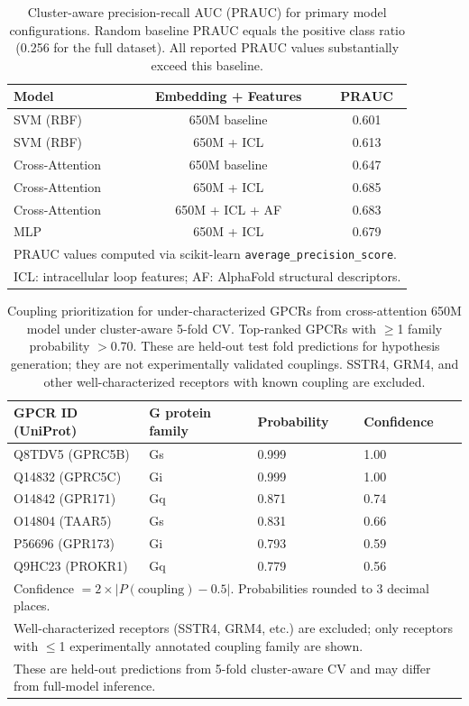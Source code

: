 \documentclass[11pt,a4paper]{article}
\begin{document}
\begin{table}[h!]
\centering
\caption{Cluster-aware precision-recall AUC (PRAUC) for primary model configurations. Random baseline PRAUC equals the positive class ratio (0.256 for the full dataset). All reported PRAUC values substantially exceed this baseline.}
\label{tab:prauc}
\begin{tabular}{lcc}
\toprule
Model & Embedding + Features & PRAUC \\
\midrule
SVM (RBF)       & 650M baseline      & 0.601 \\
SVM (RBF)       & 650M + ICL         & 0.613 \\
Cross-Attention & 650M baseline      & 0.647 \\
Cross-Attention & 650M + ICL         & 0.685 \\
Cross-Attention & 650M + ICL + AF    & 0.683 \\
MLP             & 650M + ICL         & 0.679 \\
\bottomrule
\multicolumn{3}{l}{\small PRAUC values computed via scikit-learn \texttt{average\_precision\_score}.} \\
\multicolumn{3}{l}{\small ICL: intracellular loop features; AF: AlphaFold structural descriptors.} \\
\end{tabular}
\end{table}

\begin{table}[h!]
\centering
\caption{Coupling prioritization for under-characterized GPCRs from cross-attention 650M model under cluster-aware 5-fold CV. Top-ranked GPCRs with $\ge$1 family probability $>$0.70. These are held-out test fold predictions for hypothesis generation; they are not experimentally validated couplings. SSTR4, GRM4, and other well-characterized receptors with known coupling are excluded.}
\label{tab:orphan}
\begin{tabular}{llll}
\toprule
GPCR ID (UniProt) & G protein family & Probability & Confidence \\
\midrule
Q8TDV5 (GPRC5B)  & Gs   & 0.999 & 1.00 \\
Q14832 (GPRC5C)  & Gi   & 0.999 & 1.00 \\
O14842 (GPR171)  & Gq   & 0.871 & 0.74 \\
O14804 (TAAR5)   & Gs   & 0.831 & 0.66 \\
P56696 (GPR173)  & Gi   & 0.793 & 0.59 \\
Q9HC23 (PROKR1)  & Gq   & 0.779 & 0.56 \\
\midrule
\multicolumn{4}{l}{\small Confidence $= 2 \times |P(\text{coupling}) - 0.5|$. Probabilities rounded to 3 decimal places.} \\
\multicolumn{4}{l}{\small Well-characterized receptors (SSTR4, GRM4, etc.) are excluded; only receptors with $\le$1 experimentally annotated coupling family are shown.} \\
\multicolumn{4}{l}{\small These are held-out predictions from 5-fold cluster-aware CV and may differ from full-model inference.} \\
\end{tabular}
\end{table}
\end{document}
